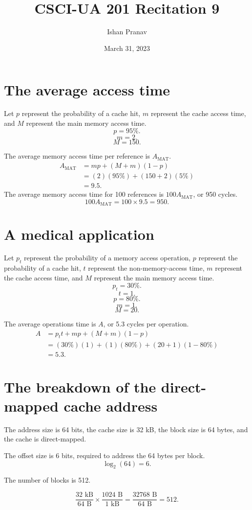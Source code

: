 \documentclass[12pt]{article}
\title{CSCI-UA 201 Recitation 9}
\author{Ishan Pranav}
\date{March 31, 2023}
\begin{document}
\maketitle
\section{The average access time}
Let $p$ represent the probability of a cache hit, $m$ represent the cache access time, and $M$ represent the main memory access time.
\[p=95\%.\]
\[m=2.\]
\[M=150.\]

The average memory access time per reference is $A_{\text{MAT}}$.
\begin{align*}
A_{\text{MAT}}
&=mp+(M+m)(1-p)\\
&=(2)(95\%)+(150+2)(5\%)\\
&=9.5.
\end{align*}
The average memory access time for 100 references is $100A_{\text{MAT}}$, or 950 cycles.
\[100A_{\text{MAT}}=100\times 9.5=950.\]
\section{A medical application}
Let $p_t$ represent the probability of a memory access operation, $p$ represent the probability of a cache hit, $t$ represent the non-memory-access time, $m$ represent the cache access time, and $M$ represent the main memory access time.
\[p_t=30\%.\]
\[t=1.\]
\[p=80\%.\]
\[m=1.\]
\[M=20.\]

The average operations time is $A$, or 5.3 cycles per operation.
\begin{align*}
A
&=p_tt+mp+(M+m)(1-p)\\
&=(30\%)(1)+(1)(80\%)+(20+1)(1-80\%)\\
&=5.3.
\end{align*}
\section{The breakdown of the direct-mapped cache address}
The address size is 64 bits, the cache size is 32 kB, the block size is 64 bytes, and the cache is direct-mapped.

The offset size is 6 bits, required to address the 64 bytes per block.
\[\log_2(64)=6.\]

The number of blocks is 512.

\[\frac{32\text{ kB}}{64\text{ B}}\times\frac{1024\text{ B}}{1\text{ kB}}=\frac{32768\text{ B}}{64\text{ B}}=512.\]
\end{document}
